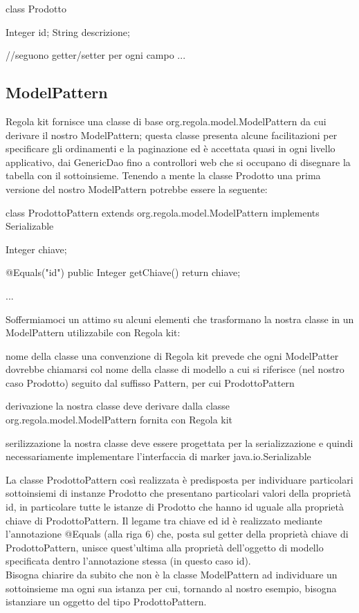 \begin{java}
class Prodotto {
    Integer id;
    String  descrizione;

    //seguono getter/setter per ogni campo
    ...
}
\end{java}

\subsection{ModelPattern}
Regola kit fornisce una classe di base org.regola.model.ModelPattern da cui derivare il nostro ModelPattern; questa classe presenta alcune facilitazioni per specificare gli ordinamenti e la paginazione ed è accettata quasi in ogni livello applicativo, dai GenericDao fino a controllori web che si occupano di disegnare la tabella con il sottoinsieme. Tenendo a mente la classe Prodotto una prima versione del nostro ModelPattern potrebbe essere la seguente:

\begin{java}
class ProdottoPattern extends org.regola.model.ModelPattern 
    implements Serializable {
    
    Integer  chiave;

    @Equals("id")
    public Integer getChiave() {
        return chiave;
    }

    ...
}
\end{java}

Soffermiamoci un attimo su alcuni elementi che trasformano la nostra classe in un ModelPattern utilizzabile con Regola kit:

\begin{description*}
  \item[nome della classe] una convenzione di Regola kit prevede che ogni ModelPatter dovrebbe chiamarsi col nome della classe di modello a cui si riferisce (nel nostro caso Prodotto) seguito dal suffisso Pattern, per cui ProdottoPattern
  \item[derivazione] la nostra classe deve derivare dalla classe org.regola.model.ModelPattern fornita con Regola kit
\item[serilizzazione] la nostra classe deve essere progettata per la serializzazione e quindi necessariamente implementare l'interfaccia di marker java.io.Serializable
\end{description*}

La classe ProdottoPattern così realizzata è predisposta per individuare particolari sottoinsiemi di instanze Prodotto che presentano particolari valori della proprietà id, in particolare tutte le istanze di Prodotto che hanno id uguale alla proprietà chiave di ProdottoPattern. Il legame tra chiave ed id è realizzato mediante l'annotazione @Equals (alla riga 6) che, posta sul getter della proprietà chiave di ProdottoPattern, unisce quest'ultima alla proprietà dell'oggetto di modello specificata dentro l'annotazione stessa (in questo caso id).
\\
Bisogna chiarire da subito che non è la classe ModelPattern ad individuare un sottoinsieme ma ogni sua istanza per cui, tornando al nostro esempio, bisogna istanziare un oggetto del tipo ProdottoPattern. 

